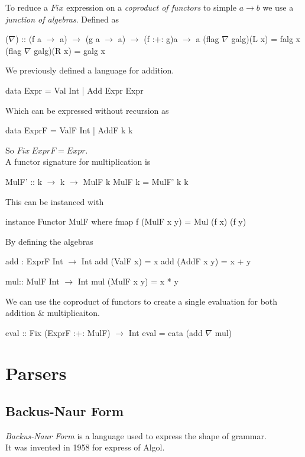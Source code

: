\documentclass[11pt,a4paper]{article}
\begin{document}
To reduce a $Fix$ expression on a \textit{coproduct of functors} to simple $a \to b$ we use a \textit{junction of algebras}. Defined as
\begin{code}
($\nabla$) :: (f a $\to$ a) $\to$ (g a $\to$ a) $\to$ (f :+: g)a $\to$ a
(flag $\nabla$ galg)(L x) = falg x
(flag $\nabla$ galg)(R x) = galg x
\end{code}

We previously defined a language for addition.
\begin{code}
data Expr = Val Int
          | Add Expr Expr
\end{code}
Which can be expressed without recursion as
\begin{code}
data ExprF = ValF Int
           | AddF k k
\end{code}
So $Fix\ ExprF=Expr$.\\
A functor signature for multiplication is
\begin{code}
MulF' :: k $\to$ k $\to$ MulF k
MulF k = MulF' k k
\end{code}
This can be instanced with
\begin{code}
instance Functor MulF where
  fmap f (MulF x y) = Mul (f x) (f y)
\end{code}
By defining the algebras
\begin{code}
add : ExprF Int $\to$ Int
add (ValF x) = x
add (AddF x y) = x + y

mul:: MulF Int $\to$ Int
mul (MulF x y) = x * y
\end{code}
We can use the coproduct of functors to create a single evaluation for both addition \& multiplicaiton.
\begin{code}
eval :: Fix (ExprF :+: MulF) $\to$ Int
eval = cata (add $\nabla$ mul)
\end{code}

\section{Parsers}

\subsection{Backus-Naur Form}

\textit{Backus-Naur Form} is a language used to express the shape of grammar.\\
It was invented in 1958 for express of Algol.\\
\end{document}
